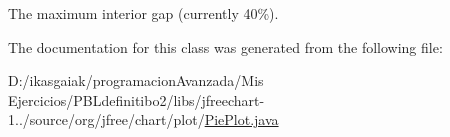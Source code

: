 The maximum interior gap (currently 40\%). 

The documentation for this class was generated from the following file\+:\begin{DoxyCompactItemize}
\item 
D\+:/ikasgaiak/programacion\+Avanzada/\+Mis Ejercicios/\+P\+B\+Ldefinitibo2/libs/jfreechart-\/1../source/org/jfree/chart/plot/\mbox{\hyperlink{_pie_plot_8java}{Pie\+Plot.\+java}}\end{DoxyCompactItemize}
